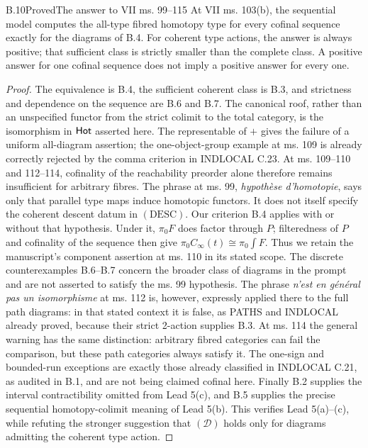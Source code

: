 \begin{claim}{B.10}{Proved}{The answer to VII ms. 99--115}
\label{B:manuscript}
At VII ms. 103(b), the sequential model computes the all-type
fibred homotopy type for every cofinal sequence exactly for the
diagrams of B.4. For coherent type actions, the answer is always
positive; that sufficient class is strictly smaller than the
complete class. A positive answer for one cofinal sequence does
not imply a positive answer for every one.
\end{claim}
\begin{proof}
The equivalence is B.4, the sufficient coherent class is B.3,
and strictness and dependence on the sequence are B.6 and B.7.
The canonical roof, rather than an unspecified functor from the
strict colimit to the total category, is the isomorphism in
$\mathsf{Hot}$ asserted here. The representable of $+$ gives the
failure of a uniform all-diagram assertion; the one-object-group
example at ms. 109 is already correctly rejected by the comma
criterion in INDLOCAL C.23. At ms. 109--110 and 112--114,
cofinality of the reachability preorder alone therefore remains
insufficient for arbitrary fibres. The phrase
at ms. 99, \emph{hypoth\`ese d'homotopie}, says only that
parallel type maps induce homotopic functors. It does not itself
specify the coherent descent datum in $(\mathrm{DESC})$.
Our criterion B.4 applies with or without that hypothesis.
Under it, $\pi_0F$ does factor through $P$; filteredness of $P$
and cofinality of the sequence then give
$\pi_0 C_\infty(t)\cong\pi_0\int F$. Thus we retain the
manuscript's component assertion at ms. 110 in its stated scope.
The discrete counterexamples B.6--B.7 concern the broader class
of diagrams in the prompt and are not asserted to satisfy the
ms. 99 hypothesis. The phrase
\emph{n'est en g\'en\'eral pas un isomorphisme} at ms. 112 is,
however, expressly applied there to the full path diagrams:
in that stated context it is false, as PATHS and INDLOCAL already
proved, because their strict 2-action supplies B.3. At ms. 114
the general warning has the same distinction: arbitrary
fibred categories can fail the comparison, but these path
categories always satisfy it. The one-sign and bounded-run
exceptions are exactly those already classified in INDLOCAL
C.21, as audited in B.1, and are not being claimed cofinal here.
Finally B.2 supplies the interval contractibility omitted from
Lead 5(c), and B.5 supplies the precise sequential homotopy-colimit
meaning of Lead 5(b). This verifies Lead 5(a)--(c), while
refuting the stronger suggestion that $(\mathcal D)$ holds
only for diagrams admitting the coherent type action.
\end{proof}
